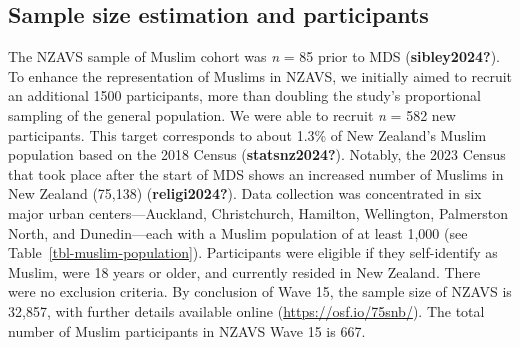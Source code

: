 \documentclass[
]{interact}
\begin{document}
\subsection{Sample size estimation and
participants}\label{sample-size-estimation-and-participants}

The NZAVS sample of Muslim cohort was \emph{n} = 85 prior to MDS
(\textbf{sibley2024?}). To enhance the representation of Muslims in
NZAVS, we initially aimed to recruit an additional 1500 participants,
more than doubling the study's proportional sampling of the general
population. We were able to recruit \emph{n} = 582 new participants.
This target corresponds to about 1.3\% of New Zealand's Muslim
population based on the 2018 Census (\textbf{statsnz2024?}). Notably,
the 2023 Census that took place after the start of MDS shows an
increased number of Muslims in New Zealand (75,138)
(\textbf{religi2024?}). Data collection was concentrated in six major
urban centers---Auckland, Christchurch, Hamilton, Wellington, Palmerston
North, and Dunedin---each with a Muslim population of at least 1,000
(see Table~\ref{tbl-muslim-population}). Participants were eligible if
they self-identify as Muslim, were 18 years or older, and currently
resided in New Zealand. There were no exclusion criteria. By conclusion
of Wave 15, the sample size of NZAVS is 32,857, with further details
available online (\url{https://osf.io/75snb/}). The total number of
Muslim participants in NZAVS Wave 15 is 667.

\begin{table}

\caption{\label{tbl-muslim-population}}


\end{table}%
\end{document}
